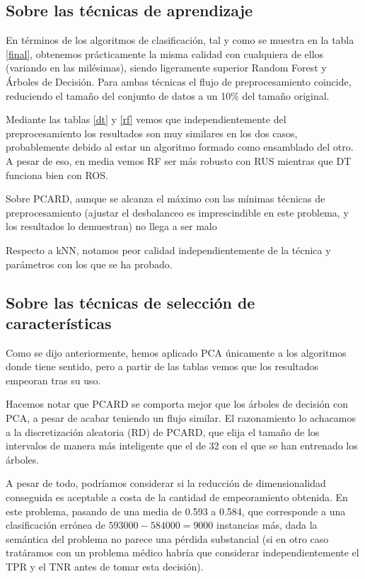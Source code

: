 \subsection{Sobre las técnicas de aprendizaje}

En términos de los algoritmos de clasificación, tal y como se muestra en la tabla \ref{final}, obtenemos prácticamente la misma calidad con cualquiera de ellos (variando en las milésimas), siendo ligeramente superior Random Forest y Árboles de Decisión. Para ambas técnicas el flujo de preprocesamiento coincide, reduciendo el tamaño del conjunto de datos a un 10\% del tamaño original.

Mediante las tablas \ref{dt} y \ref{rf} vemos que independientemente del preprocesamiento los resultados son muy similares en los dos casos, probablemente debido al estar un algoritmo formado como ensamblado del otro. A pesar de eso, en media vemos RF ser más robusto con RUS mientras que DT funciona bien con ROS.

Sobre PCARD, aunque se alcanza el máximo con las mínimas técnicas de preprocesamiento (ajustar el desbalanceo es imprescindible en este problema, y los resultados lo demuestran) no llega a ser malo

Respecto a kNN, notamos peor calidad independientemente de la técnica y parámetros con los que se ha probado. 

\subsection{Sobre las técnicas de selección de características}

Como se dijo anteriormente, hemos aplicado PCA únicamente a los algoritmos donde tiene sentido, pero a partir de las tablas vemos que los resultados empeoran tras su uso.

Hacemos notar que PCARD se comporta mejor que los árboles de decisión con PCA, a pesar de acabar teniendo un flujo similar. El razonamiento lo achacamos a la discretización aleatoria (RD) de PCARD, que elija el tamaño de los intervalos de manera más inteligente que el de 32 con el que se han entrenado los árboles.

A pesar de todo, podríamos considerar si la reducción de dimensionalidad conseguida es aceptable a costa de la cantidad de empeoramiento obtenida. En este problema, pasando de una media de 0.593 a 0.584, que corresponde a una clasificación errónea de $593000 - 584000 = 9000$ instancias más, dada la semántica del problema no parece una pérdida substancial (si en otro caso tratáramos con un problema médico habría que considerar independientemente el TPR y el TNR antes de tomar esta decisión).

